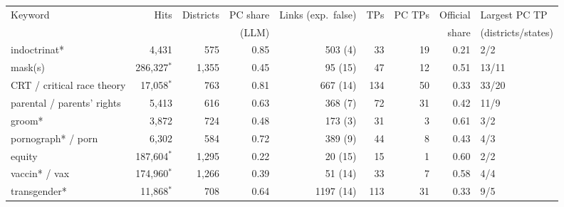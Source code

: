 \begin{tabular}{lrrrrrrrl}
\toprule
Keyword & Hits & Districts & PC share & Links (exp.\ false) & TPs & PC TPs & Official & Largest PC TP \\
 & & & (LLM) & & & & share & (districts/states) \\
\midrule
indoctrinat* & 4,431 & 575 & 0.85 & 503 (4) & 33 & 19 & 0.21 & 2/2 \\
mask(s) & 286,327$^{*}$ & 1,355 & 0.45 & 95 (15) & 47 & 12 & 0.51 & 13/11 \\
CRT / critical race theory & 17,058$^{*}$ & 763 & 0.81 & 667 (14) & 134 & 50 & 0.33 & 33/20 \\
parental / parents' rights & 5,413 & 616 & 0.63 & 368 (7) & 72 & 31 & 0.42 & 11/9 \\
groom* & 3,872 & 724 & 0.48 & 173 (3) & 31 & 3 & 0.61 & 3/2 \\
pornograph* / porn & 6,302 & 584 & 0.72 & 389 (9) & 44 & 8 & 0.43 & 4/3 \\
equity & 187,604$^{*}$ & 1,295 & 0.22 & 20 (15) & 15 & 1 & 0.60 & 2/2 \\
vaccin* / vax & 174,960$^{*}$ & 1,266 & 0.39 & 51 (14) & 33 & 7 & 0.58 & 4/4 \\
transgender* & 11,868$^{*}$ & 708 & 0.64 & 1197 (14) & 113 & 31 & 0.33 & 9/5 \\
\bottomrule
\end{tabular}

